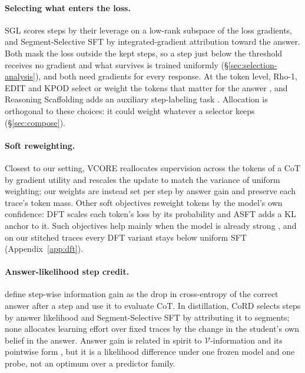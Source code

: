 \documentclass[11pt]{article}
\begin{document}
\paragraph{Selecting what enters the loss.}
SGL \citep{fan2026sgl} scores steps by their leverage on a low-rank subspace of the loss gradients, and Segment-Selective SFT \citep{wang2026segattr} by integrated-gradient attribution toward the answer.
Both mask the loss outside the kept steps, so a step just below the threshold receives no gradient and what survives is trained uniformly (\S\ref{sec:selection-analysis}), and both need gradients for every response.
At the token level, Rho-1, EDIT and KPOD select or weight the tokens that matter for the answer \citep{lin2024rho1,dai2024edit,feng2024kpod}, and Reasoning Scaffolding adds an auxiliary step-labeling task \citep{wen2026scaffolding}.
Allocation is orthogonal to these choices: it could weight whatever a selector keeps (\S\ref{sec:compose}).

\paragraph{Soft reweighting.}
Closest to our setting, VCORE \citep{gong2026vcore} reallocates supervision across the tokens of a CoT by gradient utility and rescales the update to match the variance of uniform weighting; our weights are instead set per step by answer gain and preserve each trace's token mass.
Other soft objectives reweight tokens by the model's own confidence: DFT \citep{wu2026dft} scales each token's loss by its probability and ASFT \citep{zhu2026asft} adds a KL anchor to it.
Such objectives help mainly when the model is already strong \citep{li2026beyondll}, and on our stitched traces every DFT variant stays below uniform SFT (Appendix~\ref{app:dft}).

\paragraph{Answer-likelihood step credit.}
\citet{ton2025infogain} define step-wise information gain as the drop in cross-entropy of the correct answer after a step and use it to evaluate CoT.
In distillation, CoRD selects steps by answer likelihood and Segment-Selective SFT by attributing it to segments; none allocates learning effort over fixed traces by the change in the student's own belief in the answer.
Answer gain is related in spirit to $\mathcal{V}$-information \citep{xu2020usable} and its pointwise form \citep{ethayarajh2022pvi}, but it is a likelihood difference under one frozen model and one probe, not an optimum over a predictor family.
\end{document}
